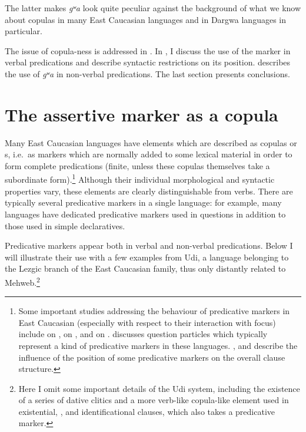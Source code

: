 ﻿\documentclass[output=paper]{langsci/langscibook}
\begin{document}
The latter makes \emph{gʷa} look quite peculiar against the background
of what we know about copulas in many East Caucasian languages and in
Dargwa languages in particular.

The issue of copula-ness is addressed in . In , I
discuss the use of the marker in verbal predications and describe
syntactic restrictions on its position.  describes the use of
\emph{gʷa} in non-verbal predications. The last section presents
conclusions.

\section{The assertive marker as a copula}\label{the-assertive-marker-as-a-copula}

Many East Caucasian languages have elements which are described as
copulas or s, i.e.\ as markers which are normally added
to some lexical material in order to form complete predications (finite,
unless these copulas themselves take a subordinate form).\footnote{Some
  important studies addressing the behaviour of predicative markers in
  East Caucasian (especially with respect to their interaction with
  focus) include
  \citet{harris2000,harris2002} on , \citet{kazenin2002} on ,
  \citet{sumbatova2011} and \citet{sumbatova-lander2014} on .
  \citet{forker2013} discusses question particles which typically represent a
  kind of predicative markers in these languages. \citet{testelets1998},
  \citet{kalinina-sumbatova2007} and \citet{forker-belyaev2016} describe
  the influence of the position of some predicative markers on the
  overall clause structure.} Although their individual morphological and
syntactic properties vary, these elements are clearly distinguishable
from verbs. There are typically several predicative markers in a single
language: for example, many languages have dedicated predicative markers
used in questions in addition to those used in simple declaratives.

Predicative markers appear both in verbal and non-verbal predications.
Below I will illustrate their use with a few examples from Udi, a
language belonging to the Lezgic branch of the East Caucasian family,
thus only distantly related to Mehweb.\footnote{Here I omit some
  important details of the Udi system, including the existence of a
  series of dative clitics and a more verb-like copula-like element used
  in existential, , and identificational clauses, which also
  takes a predicative marker.}
\end{document}
